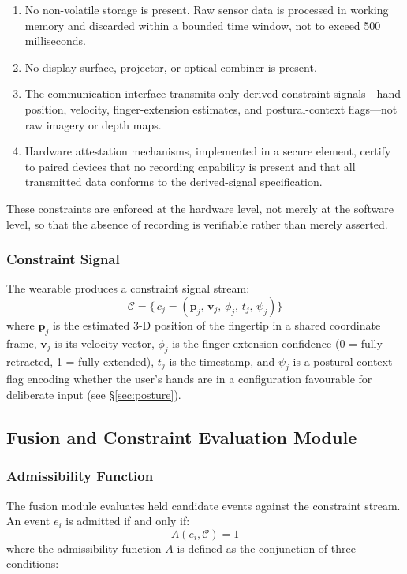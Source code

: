 \documentclass[11pt,letterpaper]{article}
\begin{document}
\begin{enumerate}[leftmargin=2em, label=\alph*.]
  \item No non-volatile storage is present. Raw sensor data is processed in working
        memory and discarded within a bounded time window, not to exceed 500
        milliseconds.
  \item No display surface, projector, or optical combiner is present.
  \item The communication interface transmits only derived constraint signals---hand
        position, velocity, finger-extension estimates, and postural-context
        flags---not raw imagery or depth maps.
  \item Hardware attestation mechanisms, implemented in a secure element, certify
        to paired devices that no recording capability is present and that all
        transmitted data conforms to the derived-signal specification.
\end{enumerate}

These constraints are enforced at the hardware level, not merely at the software
level, so that the absence of recording is verifiable rather than merely asserted.

\subsubsection{Constraint Signal}

The wearable produces a constraint signal stream:
\[
  \mathcal{C} = \bigl\{\, c_j = (\mathbf{p}_j,\, \mathbf{v}_j,\, \phi_j,\, t_j,\,
  \psi_j) \bigr\}
\]
where $\mathbf{p}_j$ is the estimated 3-D position of the fingertip in a shared
coordinate frame, $\mathbf{v}_j$ is its velocity vector, $\phi_j$ is the
finger-extension confidence (0 = fully retracted, 1 = fully extended), $t_j$ is the
timestamp, and $\psi_j$ is a postural-context flag encoding whether the user's hands
are in a configuration favourable for deliberate input (see \S\ref{sec:posture}).

\subsection{Fusion and Constraint Evaluation Module}

\subsubsection{Admissibility Function}

The fusion module evaluates held candidate events against the constraint stream. An
event $e_i$ is admitted if and only if:
\[
  A(e_i, \mathcal{C}) = 1
\]
where the admissibility function $A$ is defined as the conjunction of three conditions:
\end{document}
